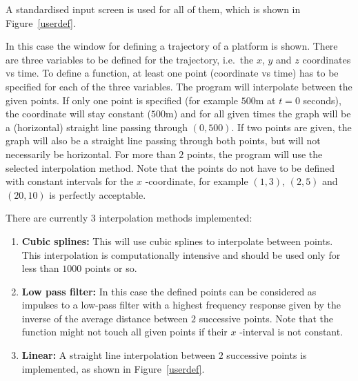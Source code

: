 A standardised input screen is used for all of them, which is shown in
Figure~\ref{userdef}.


In this case the window for defining a trajectory of a platform is shown.
There are three variables to be defined for the trajectory, i.e.~the $x$, $y$
and $z$ coordinates vs time. To define a function, at least one point
(coordinate vs time) has to be specified for each of the three variables.
The program will interpolate between the given points. If only one point is
specified (for example $500$\thinspace m at $t=0$ seconds), the coordinate
will stay constant ($500$\thinspace m) and for all given times the graph
will be a (horizontal) straight line passing through $(0,500)$. If two
points are given, the graph will also be a straight line passing through
both points, but will not necessarily be horizontal. For more than $2$
points, the program will use the selected interpolation method. Note that
the points do not have to be defined with constant intervals for the $x$%
-coordinate, for example $(1,3)$, $(2,5)$ and $(20,10)$ is perfectly
acceptable.

There are currently $3$ interpolation methods implemented:

\begin{enumerate}
\item  \textbf{Cubic splines: }This will use cubic splines to interpolate
between points. This interpolation is computationally intensive and should
be used only for less than $1000$ points or so.

\item  \textbf{Low pass filter: }In this case the defined points can be
considered as impulses to a low-pass filter with a highest frequency
response given by the inverse of the average distance between $2$ successive
points. Note that the function might not touch all given points if their $x$%
-interval is not constant.

\item  \textbf{Linear: }A straight line interpolation between $2$ successive
points is implemented, as shown in Figure~\ref{userdef}.
\end{enumerate}

